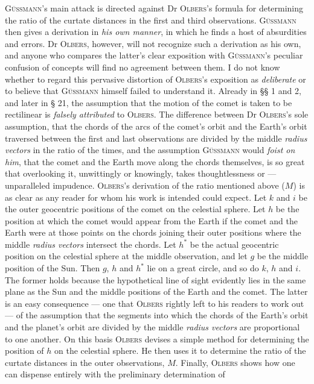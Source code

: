\textsc{Güssmann}’s main attack is directed against Dr \textsc{Olbers}’s formula for determining the ratio of the curtate distances in the first and third observations. \textsc{Güssmann} then gives a derivation in \emph{his own manner}, in which he finds a host of absurdities and errors. Dr \textsc{Olbers}, however, will not recognize such a derivation as his own, and anyone who compares the latter’s clear exposition with \textsc{Güssmann}’s peculiar confusion of concepts will find no agreement between them. I do not know whether to regard this pervasive distortion of \textsc{Olbers}’s exposition as \emph{deliberate} or to believe that \textsc{Güssmann} himself failed to understand it. Already in §§ 1 and 2, and later in § 21, the assumption that the motion of the comet is taken to be rectilinear is \emph{falsely attributed} to \textsc{Olbers}. The difference between Dr \textsc{Olbers}’s sole assumption, that the chords of the arcs of the comet’s orbit and the Earth’s orbit traversed between the first and last observations are divided by the middle \emph{radius vectors} in the ratio of the times, and the assumption \textsc{Güssmann} would \emph{foist on him}, that the comet and the Earth move along the chords themselves, is so great that overlooking it, unwittingly or knowingly, takes thoughtlessness or — unparalleled impudence. \textsc{Olbers}’s derivation of the ratio mentioned above ($M$) is as clear as any reader for whom his work is intended could expect. Let $k$ and $i$ be the outer geocentric positions of the comet on the celestial sphere. Let $h$ be the position at which the comet would appear from the Earth if the comet and the Earth were at those points on the chords joining their outer positions where the middle \emph{radius vectors} intersect the chords. Let $h^*$ be the actual geocentric position on the celestial sphere at the middle observation, and let $g$ be the middle position of the Sun. Then $g$, $h$ and $h^*$ lie on a great circle, and so do $k$, $h$ and $i$. The former holds because the hypothetical line of sight evidently lies in the same plane as the Sun and the middle positions of the Earth and the comet. The latter is an easy consequence — one that \textsc{Olbers} rightly left to his readers to work out — of the assumption that the segments into which the chords of the Earth’s orbit and the planet’s orbit are divided by the middle \emph{radius vectors} are proportional to one another. On this basis \textsc{Olbers} devises a simple method for determining the position of $h$ on the celestial sphere. He then uses it to determine the ratio of the curtate distances in the outer observations, $M$. Finally, \textsc{Olbers} shows how one can dispense entirely with the preliminary determination of
